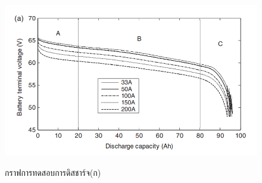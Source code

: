 \begin{center}
	\begin{figure}[H]
		\includegraphics[width=0.6\linewidth]{Chapters/img/IV_a.png}
			\centering
			\captionsetup{justification=centering,margin=2cm}
			\caption{กราฟการทดสอบการดิสชาร์จ(ก)}
			\cite{jiangzhang2015}
	\end{figure}
\end{center}
